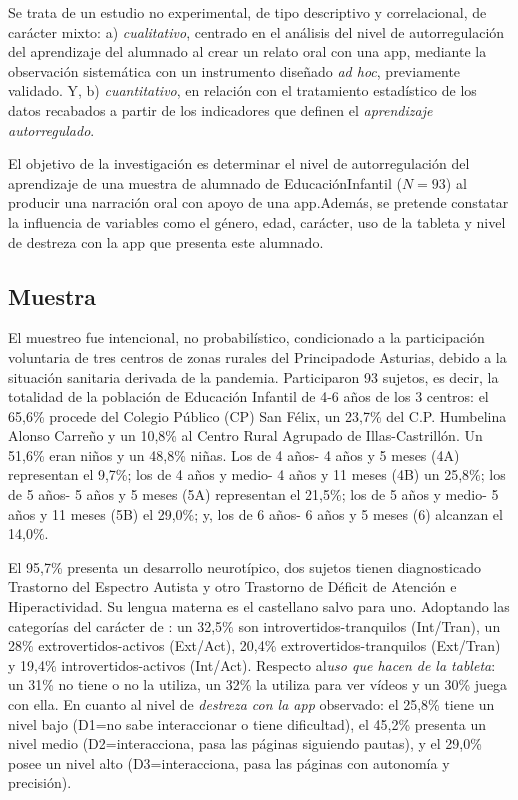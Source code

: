 \documentclass[spanish]{textolivre}
\begin{document}
Se trata de un estudio no experimental, de tipo descriptivo y correlacional, de carácter mixto: a) \textit{cualitativo}, centrado en el análisis del nivel de autorregulación del aprendizaje del alumnado al crear un relato oral con una app, mediante la observación sistemática con un instrumento diseñado \textit{ad hoc}, previamente validado. Y, b) \textit{cuantitativo}, en relación con el tratamiento estadístico de los datos recabados a partir de los indicadores que definen el \textit{aprendizaje autorregulado}.

El objetivo de la investigación es determinar el nivel de
autorregulación del aprendizaje de una muestra de alumnado de EducaciónInfantil ($N=93$) al producir una narración oral con apoyo de una app.Además, se pretende constatar la influencia de variables como el género,
edad, carácter, uso de la tableta y nivel de destreza con la app que
presenta este alumnado.

\subsection{Muestra}\label{sec-muestra}

El muestreo fue intencional, no probabilístico, condicionado a la
participación voluntaria de tres centros de zonas rurales del Principadode Asturias, debido a la situación sanitaria derivada de la pandemia. Participaron 93 sujetos, es decir, la totalidad de la población de
Educación Infantil de 4-6 años de los 3 centros: el 65,6\% procede del
Colegio Público (CP) San Félix, un 23,7\% del C.P. Humbelina Alonso
Carreño y un 10,8\% al Centro Rural Agrupado de Illas-Castrillón. Un
51,6\% eran niños y un 48,8\% niñas. Los de 4 años- 4 años y 5 meses (4A)
representan el 9,7\%; los de 4 años y medio- 4 años y 11 meses (4B) un
25,8\%; los de 5 años- 5 años y 5 meses (5A) representan el 21,5\%; los
de 5 años y medio- 5 años y 11 meses (5B) el 29,0\%; y, los de 6 años- 6
años y 5 meses (6) alcanzan el 14,0\%.

El 95,7\% presenta un desarrollo neurotípico, dos sujetos tienen
diagnosticado Trastorno del Espectro Autista y otro Trastorno de Déficit
de Atención e Hiperactividad. Su lengua materna es el castellano salvo
para uno. Adoptando las categorías del carácter de \textcite{cristobal_extroversion_2017}: un 32,5\% son introvertidos-tranquilos (Int/Tran), un
28\% extrovertidos-activos (Ext/Act), 20,4\% extrovertidos-tranquilos
(Ext/Tran) y 19,4\% introvertidos-activos (Int/Act). Respecto al\emph{uso que hacen de la tableta}: un 31\% no tiene o no la utiliza, un 32\% la utiliza para ver vídeos y un 30\% juega con ella. En cuanto al
nivel de \emph{destreza con la app }observado: el 25,8\% tiene un nivel
bajo (D1=no sabe interaccionar o tiene dificultad), el 45,2\% presenta
un nivel medio (D2=interacciona, pasa las páginas siguiendo pautas), y
el 29,0\% posee un nivel alto (D3=interacciona, pasa las páginas con
autonomía y precisión).
\end{document}
